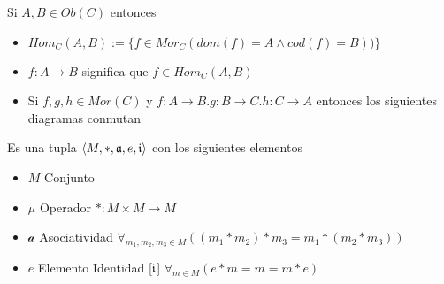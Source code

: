 \begin{note}
Si $A,B \in Ob(C)$ entonces 

\begin{itemize}
\item $Hom_{C}(A,B):= \{ f \in Mor_{C}(dom(f)=A \wedge cod(f)=B)) \}$
\item $f: A \to B$ significa que $f \in Hom_{C}(A,B)$
\item Si $f,g,h \in Mor(C)$ y $f:A \to B.g:B \to C.h:C \to A$ entonces los siguientes diagramas conmutan

	
\end{itemize}
\end{note}

\begin{defn}[Monoide]
Es una tupla $\langle M, *, \mathfrak{a}, e, \mathfrak{i} \rangle$ con los siguientes elementos
\begin{itemize}
\item $M$ Conjunto
\item $\mu$ Operador $* : M \times M \to M$
\item $\mathcal{a}$ Asociatividad $\forall_{m_1, m_2, m_3 \in M} ((m_1 * m_2) * m_3 = m_1 * (m_2 * m_3))$
\item $e$ Elemento Identidad [$\mathfrak{i}$] $\forall_{m \in M} ( e * m = m = m * e)$
\end{itemize}
\end{defn}